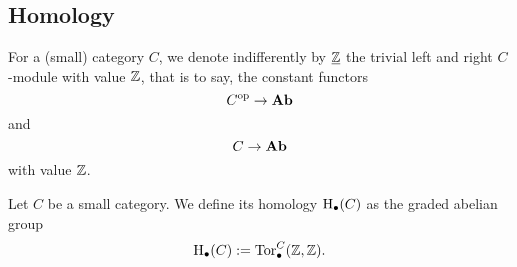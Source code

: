 \subsection{Homology}
\begin{paragr}
  For a (small) category $C$, we denote indifferently by $\underline{\mathbb Z}$
  the trivial left and right $C$-module with value $\mathbb Z$, that is to
  say, the constant functors
  \[
    C^{{\mathrm{op}}} \to \mathbf{Ab}
  \]
  and
  \[
    C \to \mathbf{Ab}
  \]
  with value $\mathbb Z$.
\end{paragr}
\begin{definition}
  Let $C$ be a small category. We define its homology $\mathrm{H}_{\bullet}(C)$ as the
  graded abelian group
  \[
    \mathrm{H}_{\bullet}(C):=\mathrm{Tor}^{C}_{\bullet}(\mathbb Z,\mathbb Z).
  \]
\end{definition}